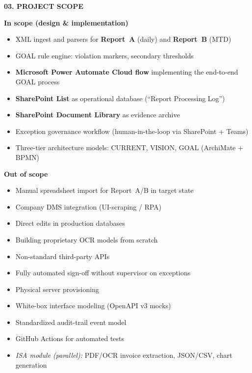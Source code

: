 \documentclass[11pt,a4paper]{article}
\newcommand{\sectiontitle}[1]{%
  \vspace{1.2em}%
  {\color{ISAAIBlue}\bfseries\MakeUppercase{#1}}%
  \vspace{0.4em}\par
}
\begin{document}
\sectiontitle{03. Project scope}

\begin{minipage}[t]{0.48\textwidth}
{\color{ISAAIGreen}\bfseries In scope (design \& implementation)}
\begin{itemize}[leftmargin=*, nosep]
  \item XML ingest and parsers for \textbf{Report~A} (daily) and \textbf{Report~B} (MTD)
  \item GOAL rule engine: violation markers, secondary thresholds
  \item \textbf{Microsoft Power Automate Cloud flow} implementing the end-to-end GOAL process
  \item \textbf{SharePoint List} as operational database (``Report Processing Log'')
  \item \textbf{SharePoint Document Library} as evidence archive
  \item Exception governance workflow (human-in-the-loop via SharePoint + Teams)
  \item Three-tier architecture models: CURRENT, VISION, GOAL (ArchiMate + BPMN)
\end{itemize}
\end{minipage}\hfill
\begin{minipage}[t]{0.48\textwidth}
{\color{ISAAIRed}\bfseries Out of scope}
\begin{itemize}[leftmargin=*, nosep]
  \item Manual spreadsheet import for Report~A/B in target state
  \item Company DMS integration (UI-scraping / RPA)
  \item Direct edits in production databases
  \item Building proprietary OCR models from scratch
  \item Non-standard third-party APIs
  \item Fully automated sign-off without supervisor on exceptions
  \item Physical server provisioning
  \item White-box interface modeling (OpenAPI v3 mocks)
  \item Standardized audit-trail event model
  \item GitHub Actions for automated tests
  \item \textit{ISA module (parallel):} PDF/OCR invoice extraction, JSON/CSV, chart generation
\end{itemize}
\end{minipage}
\end{document}
